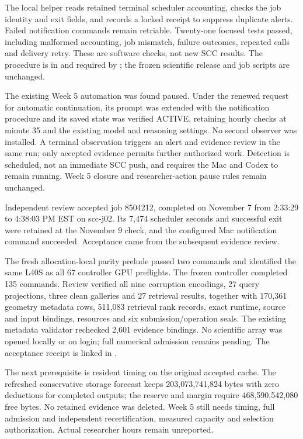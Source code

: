 The local helper reads retained terminal scheduler accounting, checks the job
identity and exit fields, and records a locked receipt to suppress duplicate
alerts. Failed notification commands remain retriable. Twenty-one focused tests
passed, including malformed accounting, job mismatch, failure outcomes, repeated
calls and delivery retry. These are software checks, not new SCC results.
The procedure is in  and required by
; the frozen scientific release and job scripts are unchanged.

The existing Week 5 automation was found paused. Under the renewed request for
automatic continuation, its prompt was extended with the notification procedure
and its saved state was verified ACTIVE, retaining hourly checks at minute 35
and the existing model and reasoning settings. No second observer was installed.
A terminal observation triggers an alert and evidence review in the same run;
only accepted evidence permits further authorized work. Detection is scheduled,
not an immediate SCC push, and requires the Mac and Codex to remain running.
Week 5 closure and researcher-action pause rules remain unchanged.



Independent review accepted job 8504212, completed on November 7 from
2:33:29 to 4:38:03 PM EST on scc-j02. Its 7,474 scheduler seconds and successful
exit were retained at the November 9 check, and the configured Mac notification
command succeeded. Acceptance came from the subsequent evidence review.

The fresh allocation-local parity prelude passed two commands and identified
the same L40S as all 67 controller GPU preflights. The frozen controller completed
135 commands. Review verified all nine corruption encodings, 27 query
projections, three clean galleries and 27 retrieval results, together with
170,361 geometry metadata rows, 511,083 retrieval rank records, exact runtime,
source and input bindings, resources and six submission/operation seals.
The existing metadata validator rechecked 2,601 evidence bindings. No scientific
array was opened locally or on login; full numerical admission remains pending.
The acceptance receipt is linked in .

The next prerequisite is resident timing on the original accepted cache.
The refreshed conservative storage forecast keeps 203,073,741,824 bytes with
zero deductions for completed outputs; the reserve and margin require
468,590,542,080 free bytes. No retained evidence was deleted. Week 5 still needs
timing, full admission and independent recertification, measured capacity and
selection authorization. Actual researcher hours remain unreported.

